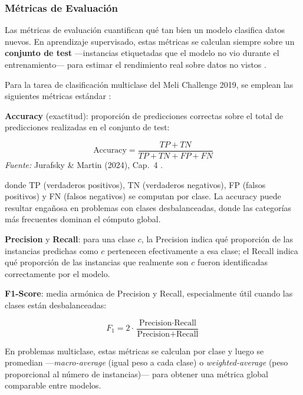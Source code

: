 \documentclass[11pt,a4paper]{article}
\begin{document}
\subsubsection{Métricas de Evaluación}
\label{sec:metricas}

Las métricas de evaluación cuantifican qué tan bien un modelo clasifica datos nuevos. En aprendizaje supervisado, estas métricas se calculan siempre sobre un \textbf{conjunto de test} ---instancias etiquetadas que el modelo no vio durante el entrenamiento--- para estimar el rendimiento real sobre datos no vistos \cite{goodfellow2016}.

Para la tarea de clasificación multiclase del Meli Challenge 2019, se emplean las siguientes métricas estándar \cite{jurafsky2024}:

\textbf{Accuracy} (exactitud): proporción de predicciones correctas sobre el total de predicciones realizadas en el conjunto de test:

\begin{equation}
\text{Accuracy} = \frac{TP + TN}{TP + TN + FP + FN}
\end{equation}
\noindent\textit{Fuente:} Jurafsky \& Martin (2024), Cap.~4 \cite{jurafsky2024}.

donde TP (verdaderos positivos), TN (verdaderos negativos), FP (falsos positivos) y FN (falsos negativos) se computan por clase. La accuracy puede resultar engañosa en problemas con clases desbalanceadas, donde las categorías más frecuentes dominan el cómputo global.

\textbf{Precision} y \textbf{Recall}: para una clase $c$, la Precision indica qué proporción de las instancias predichas como $c$ pertenecen efectivamente a esa clase; el Recall indica qué proporción de las instancias que realmente son $c$ fueron identificadas correctamente por el modelo.

\textbf{F1-Score}: media armónica de Precision y Recall, especialmente útil cuando las clases están desbalanceadas:

\begin{equation}
F_1 = 2 \cdot \frac{\text{Precision} \cdot \text{Recall}}{\text{Precision} + \text{Recall}}
\end{equation}

En problemas multiclase, estas métricas se calculan por clase y luego se promedian ---\emph{macro-average} (igual peso a cada clase) o \emph{weighted-average} (peso proporcional al número de instancias)--- para obtener una métrica global comparable entre modelos.
\end{document}
